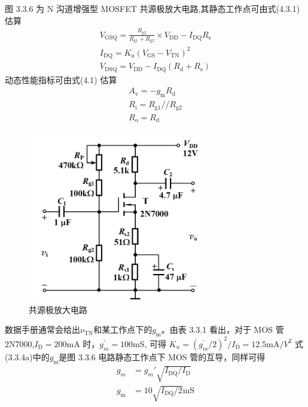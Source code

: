 \documentclass[a4paper,11pt,UTF8]{article}
\numberwithin{equation}{subsection}
\begin{document}
图 3.3.6 为 N 沟道增强型 MOSFET 共源极放大电路,其静态工作点可由式(4.3.1) 估算
\begin{subequations}\begin{align}
		V_{\mathrm{GSQ}}=\frac{R_{\mathrm{g2}}}{R_{\mathrm{g1}}+R_{\mathrm{g2}}}\times V_{\mathrm{DD}}-I_{\mathrm{DQ}}R_{\mathrm{s}}  \\
		I_{\mathrm{DQ}}=K_{\mathrm{n}}\left(V_{\mathrm{GS}}-V_{\mathrm{TN}}\right)^{2} \\
		V_{\mathrm{DSQ}}=V_{\mathrm{DD}}-I_{\mathrm{DQ}}(R_{\mathrm{d}}+R_{\mathrm{s}}) 
\end{align}\end{subequations}
动态性能指标可由式(4.1) 估算
\begin{subequations}\begin{align}
		A_\mathrm{v}=-g_\mathrm{m}R_\mathrm{d}\\
		R_{\mathrm{i}}=R_{\mathrm{g1}}//R_{\mathrm{g2}}\\
		R_{\mathrm{o}}=R_{\mathrm{d}}
\end{align}\end{subequations}

\begin{figure}[H]
	\centering
	\includegraphics[width=0.7\textwidth]{2.1.png}
	\caption{共源极放大电路}
\end{figure}


数据手册通常会给出$\nu_\mathrm{TN}$和某工作点下的$g_\mathrm{m}$。由表 3.3.1 看出，对于 MOS 管 2N7000,$I_{\mathrm{D} }= 200$mA 时，$g_m^{\prime}= 100$mS, 可得 $K_n= ( g_m^{\prime}/2) ^2/I_{\mathrm{D} }= 12.5$mA$/V^2$ 式(3.3.4a)中的$g_\mathrm{m}$是图 3.3.6 电路静态工作点下 MOS 管的互导，同样可得
\begin{align}
	g_m&=g_m'\sqrt{I_{\mathrm{DQ}}/I_{\mathrm{D}}}\\
	g_{\mathrm{m}}&=10\sqrt{I_{\mathrm{DQ}}/2}\mathrm{mS}
\end{align}
\end{document}
